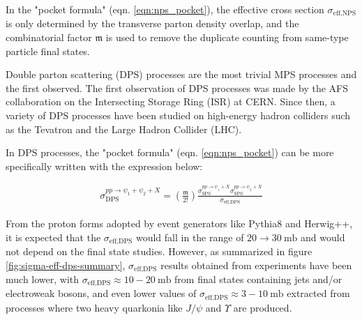 \documentclass[10pt,twocolumn]{article}
\newcommand*{\effXsecDPS}{\sigma_{\text{eff,DPS}}}
\begin{document}
In the "pocket formula" (eqn. \ref{eqn:nps_pocket}), the effective cross section $\sigma_{\text{eff,NPS}}$ is only determined by the transverse parton density overlap, and the combinatorial factor $\mathfrak{m}$ is used to remove the duplicate counting from same-type particle final states.

Double parton scattering (DPS) processes are the most trivial MPS processes and the first observed. The first observation of DPS processes was made by the AFS collaboration on the Intersecting Storage Ring (ISR) at CERN\cite{ISR_DPS}. Since then, a variety of DPS processes have been studied on high-energy hadron colliders such as the Tevatron and the Large Hadron Collider (LHC).

In DPS processes, the "pocket formula" (eqn. \ref{eqn:nps_pocket}) can be more specifically written with the expression below:

\begin{equation}
\begin{aligned}
    \label{eqn:dps_pocket}
    \sigma^{pp\to\psi_1+\psi_2+X}_{\text{DPS}}=
    \left(\frac {\mathfrak{m}}{2!}\right) \frac{\sigma_{\text{SPS}}^{pp\to \psi_1+X}\sigma_{\text{SPS}}^{pp\to \psi_2+X}}{\effXsecDPS}
\end{aligned}
\end{equation}

From the proton forms adopted by event generators like Pythia8 and Herwig++, it is expected that the $\sigma_\text{eff,DPS}$ would fall in the range of $20 \to 30~\mathrm{mb}$ and would not depend on the final state studies. However, as summarized in figure \ref{fig:sigma-eff-dps-summary}, $\sigma_\text{eff,DPS}$ results obtained from experiments have been much lower, with $\sigma_\text{eff,DPS}\approx 10-20~\text{mb}$ from final states containing jets and/or electroweak bosons\cite{ATLAS_4JET_7TEV}\cite{ATLAS_WJetJet_7TEV}\cite{ATLAS_Z_JPSI}\cite{CDF_4JET}\cite{CMS_4JET_13TEV}\cite{CMS_WJETJET_7TEV}\cite{CMS_WW_DPS_8TEV_LIM}\cite{CMS_WW_DPS_13TEV_FOUND}, and even lower values of $\sigma_\text{eff,DPS}\approx 3-10~\text{mb}$ extracted from processes where two heavy quarkonia like $J/\psi$ and $\Upsilon$ are produced\cite{ATLAS_JPSIJPSI_8TEV}\cite{ATLAS_JPSI_PSI2S_7_8_TEV_COMBINED}\cite{CMS_INCL_JPSIJPSI_7TEV}\cite{ CMS_JPSIPSI2S_7TEV}\cite{CMS_JPSIPSI2S_DIFF_7TEV}\cite{CMS_YY_8TEV}\cite{CMS_YY_XSEC}.
\end{document}

